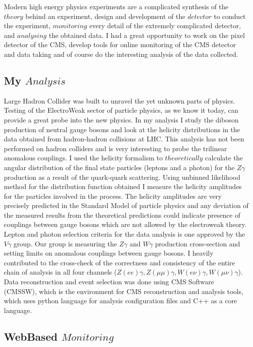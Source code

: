 \documentclass[a4paper]{article}
\begin{document}
Modern high energy physics experiments are a complicated synthesis of the $theory$ behind an experiment, design and development of the $detector$ to conduct the experiment, $monitoring$ every detail of the extremely complicated detector, and $analysing$ the obtained data. I had a great opportunity to work on the pixel detector of the CMS, develop tools for online monitoring of the CMS detector and data taking and of course do the interesting analysis of the data collected.

\subsection{My $Analysis$}

Large Hadron Collider was built to unravel the yet unknown parts of physics. Testing of the ElectroWeak sector of particle physics, as we know it today, can provide a great probe into the new physics. In my analysis I study the diboson production of neutral gauge bosons and look at the helicity distributions in the data obtained from hadron-hadron collisions at LHC. This analysis has not been performed on hadron colliders and is very interesting to probe the trilinear anomalous couplings. I used the helicity formalism to $theoretically$ calculate the angular distribution of the final state particles (leptons and a photon) for the $Z\gamma$ production as a result of the quark-quark scattering. Using unbinned likelihood method for the distribution function obtained I measure the helicity amplitudes for the particles involved in the process. The helicity amplitudes are very precisely predicted in the Standard Model of particle physics and any deviation of the measured results from the theoretical predictions could indicate presence of couplings between gauge bosons which are not allowed by the electroweak theory. Lepton and photon selection criteria for the data analysis is one approved by the $V\gamma$ group. Our group is measuring the $Z\gamma$ and $W\gamma$ production cross-section and setting limits on anomalous couplings between gauge bosons. I heavily contributed to the cross-check of the correctness and consistency of the entire chain of analysis in all four channels ($Z(ee)\gamma, Z(\mu\mu)\gamma, W(e\nu)\gamma, W(\mu\nu)\gamma$). Data reconstruction and event selection was done using CMS Software (CMSSW), which is the environment for CMS reconstruction and analysis tools, which uses python language for analysis configuration files and C++ as a core language.

\subsection{WebBased $Monitoring$}
\end{document}
